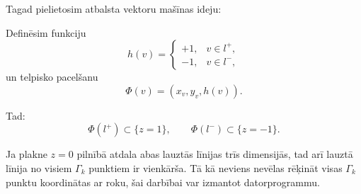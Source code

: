 \documentclass[utf8]{ludis2022}
\begin{document}
Tagad pielietosim atbalsta vektoru mašīnas ideju:

Definēsim funkciju
\[
h(v)=
\begin{cases}
+1,& v\in l^+,\\
-1,& v\in l^-,
\end{cases}
\]
un telpisko pacelšanu
\[
\Phi(v)=(x_v,y_v,h(v)).
\]

Tad:
\[
\Phi(l^+)\subset\{z=1\},
\qquad
\Phi(l^-)\subset\{z=-1\}.
\]

Ja plakne \(z=0\) pilnībā atdala abas lauztās līnijas trīs dimensijās, tad arī lauztā līnija no visiem $\Gamma_k$ punktiem ir vienkārša. Tā kā neviens nevēlas rēķināt visas $\Gamma_k$ punktu koordinātas ar roku, šai darbībai var izmantot datorprogrammu. 

\end{document}
